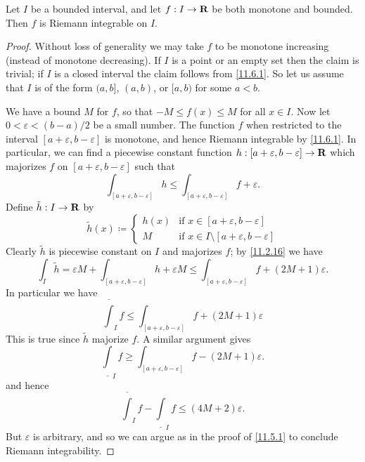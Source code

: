 \begin{corollary}\label{11.6.3}
  Let \(I\) be a bounded interval, and let \(f : I \to \mathbf{R}\) be both monotone and bounded.
  Then \(f\) is Riemann integrable on \(I\).
\end{corollary}

\begin{proof}
  Without loss of generality we may take \(f\) to be monotone increasing (instead of monotone decreasing).
  If \(I\) is a point or an empty set then the claim is trivial;
  if \(I\) is a closed interval the claim follows from \cref{11.6.1}.
  So let us assume that \(I\) is of the form \((a, b]\), \((a, b)\), or \([a, b)\) for some \(a < b\).

  We have a bound \(M\) for \(f\), so that \(-M \leq f(x) \leq M\) for all \(x \in I\).
  Now let \(0 < \varepsilon < (b - a) / 2\) be a small number.
  The function \(f\) when restricted to the interval \([a + \varepsilon, b - \varepsilon]\) is monotone, and hence Riemann integrable by \cref{11.6.1}.
  In particular, we can find a piecewise constant function \(h : [a + \varepsilon, b - \varepsilon] \to \mathbf{R}\) which majorizes \(f\) on \([a + \varepsilon, b - \varepsilon]\) such that
  \[
    \int_{[a + \varepsilon, b - \varepsilon]} h \leq \int_{[a + \varepsilon, b - \varepsilon]} f + \varepsilon.
  \]
  Define \(\tilde{h} : I \to \mathbf{R}\) by
  \[
    \tilde{h}(x) \coloneqq \begin{cases}
      h(x) & \text{if } x \in [a + \varepsilon, b - \varepsilon]             \\
      M    & \text{if } x \in I \setminus [a + \varepsilon, b - \varepsilon]
    \end{cases}
  \]
  Clearly \(\tilde{h}\) is piecewise constant on \(I\) and majorizes \(f\);
  by \cref{11.2.16} we have
  \[
    \int_I \tilde{h} = \varepsilon M + \int_{[a + \varepsilon, b - \varepsilon]} h + \varepsilon M \leq \int_{[a + \varepsilon, b - \varepsilon]} f + (2M + 1) \varepsilon.
  \]
  In particular we have
  \[
    \overline{\int}_I f \leq \int_{[a + \varepsilon, b - \varepsilon]} f + (2M + 1) \varepsilon
  \]
  This is true since \(\tilde{h}\) majorize \(f\).
  A similar argument gives
  \[
    \underline{\int}_I f \geq \int_{[a + \varepsilon, b - \varepsilon]} f - (2M + 1) \varepsilon.
  \]
  and hence
  \[
    \overline{\int}_I f - \underline{\int}_I f \leq (4M + 2) \varepsilon.
  \]
  But \(\varepsilon\) is arbitrary, and so we can argue as in the proof of \cref{11.5.1} to conclude Riemann integrability.
\end{proof}

